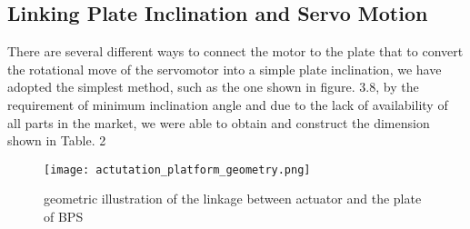 \subsection{Linking Plate Inclination and Servo Motion}
There are several different ways to connect the motor to the plate that to convert the rotational move of the servomotor into a simple plate inclination, we have adopted the simplest method, such as the one shown in figure. 3.8, by the requirement of minimum inclination angle and due to the lack of availability of all parts in the market, we were able to obtain and construct the dimension shown in Table. 2 \\
\begin{figure}[h]
    \centering
    \texttt{[image: actutation\_platform\_geometry.png]}
    \caption{geometric illustration of the linkage between actuator and the plate of BPS}
\end{figure}

